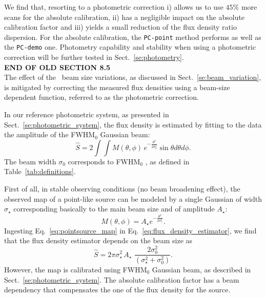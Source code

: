 We find that, resorting to a photometric correction i) allows us to use $45\%$ more
scans for the absolute calibration, ii) has a negligible impact on
the absolute calibration factor and iii) yields a small reduction of
the flux density ratio dispersion. For the absolute calibration, the
{\tt PC-point} method performs as well as the {\tt PC-demo} one.
Photometry capability and stability when using a photometric
correction will be further tested in Sect.~\ref{se:photometry}.\\

{\bf END OF OLD SECTION 8.5}\\

%

The effect of the \afternoon\ beam size variations, as discussed
in Sect.~\ref{se:beam_variation}, is mitigated by correcting the
measured flux densities using a beam-size dependent function, referred
to as the photometric correction.

In our reference photometric system, as presented in
Sect.~\ref{se:photometric_system}, 
the flux density is estimated by fitting to the data the amplitude of
the FWHM$_0$ Gaussian beam:
\begin{equation}
  \hat{S}  = 2 \int \int M(\theta, \phi)\, e^{-\frac{\theta^{2}}{2\sigma_{0}^{2}}} \sin \theta d\theta d\phi.
  \label{eq:flux_density_estimator}
\end{equation}
The beam width $\sigma_{0}$ corresponds to FWHM$_0$%
, as defined in Table~\ref{tab:definitions}.


First of all, in stable observing conditions (no beam
broadening effect), the observed map of a point-like source can be modeled by a single Gaussian of
width $\sigma_\star$ corresponding basically to the main beam size and
of amplitude $A_\star$:
\begin{equation}
  M(\theta, \phi) = A_\star e^{-\frac{\theta^{2}}{2\sigma_\star^{2}}}.
  \label{eq:pointsource_map}
\end{equation}
Ingesting Eq.~\ref{eq:pointsource_map} in
Eq.~\ref{eq:flux_density_estimator}, we find that the flux density
estimator depends on the beam size as
\begin{equation}
  \hat{S}  = 2\pi \sigma_{\star}^2 \, A_{\star} \, \,  \frac{2 \sigma_0^2}{(\sigma_{\star}^2 + \sigma_0^2)}.
  \label{eq:gaussian_star}
\end{equation}
However, the map is calibrated using FWHM$_0$ Gaussian beam, as described in
Sect.~\ref{se:photometric_system}. The absolute calibration factor %
has a beam dependency that compensates the one of the flux density for the source.

